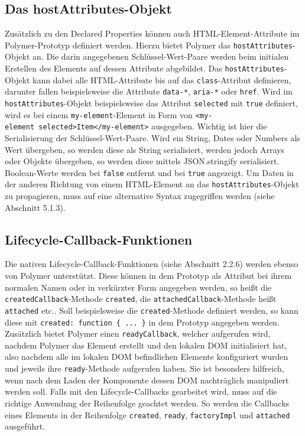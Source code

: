 \subsection{Das hostAttributes-Objekt}\label{das-hostattributes-objekt}

Zusätzlich zu den Declared Properties können auch HTML-Element-Attribute im Polymer-Prototyp definiert werden. Hierzu bietet Polymer das \texttt{hostAttributes}-Objekt an. Die darin angegebenen Schlüssel-Wert-Paare werden beim initialen Erstellen des Elements auf dessen Attribute abgebildet. Das \texttt{hostAttributes}-Objekt kann dabei alle HTML-Attribute bis auf das \texttt{class}-Attribut definieren, darunter fallen beispielsweise die Attribute \texttt{data-*}, \texttt{aria-*} oder \texttt{href}. Wird im \texttt{hostAttributes}-Objekt beispielsweise das Attribut \texttt{selected} mit \texttt{true} definiert, wird es bei einem \texttt{my-element}-Element in Form von \texttt{\textless{}my-element\ selected\textgreater{}Item\textless{}/my-element\textgreater{}} ausgegeben. Wichtig ist hier die Serialisierung der Schlüssel-Wert-Paare. Wird ein String, Dates oder Numbers als Wert übergeben, so werden diese als String serialisiert, werden jedoch Arrays oder Objekte übergeben, so werden diese mittels JSON.stringify serialisiert. Boolean-Werte werden bei \texttt{false} entfernt und bei \texttt{true} angezeigt. Um Daten in der anderen Richtung von einem HTML-Element an das \texttt{hostAttributes}-Objekt zu propagieren, muss auf eine alternative Syntax zugegriffen werden (siehe Abschnitt 5.1.3).


\subsection{Lifecycle-Callback-Funktionen}\label{lifecycle-callback-funktionen}

Die nativen Lifecycle-Callback-Funktionen (siehe Abschnitt 2.2.6) werden ebenso von Polymer unterstützt. Diese können in dem Prototyp als Attribut bei ihrem normalen Namen oder in verkürzter Form angegeben werden, so heißt die \texttt{createdCallback}-Methode \texttt{created}, die \texttt{attachedCallback}-Methode heißt \texttt{attached} etc.. Soll beispielsweise die \texttt{created}-Methode definiert werden, so kann diese mit \texttt{created:\ function\ \{\ ...\ \}} in dem Prototyp angegeben werden. Zusätzlich bietet Polymer einen \texttt{readyCallback}, welcher aufgerufen wird, nachdem Polymer das Element erstellt und den lokalen DOM initialisiert hat, also nachdem alle im lokalen DOM befindlichen Elemente konfiguriert wurden und jeweils ihre \texttt{ready}-Methode aufgerufen haben. Sie ist besonders hilfreich, wenn nach dem Laden der Komponente dessen DOM nachträglich manipuliert werden soll. Falls mit den Lifecycle-Callbacks gearbeitet wird, muss auf die richtige Anwendung der Reihenfolge geachtet werden. So werden die Callbacks eines Elements in der Reihenfolge \texttt{created}, \texttt{ready}, \texttt{factoryImpl} und \texttt{attached} ausgeführt.


